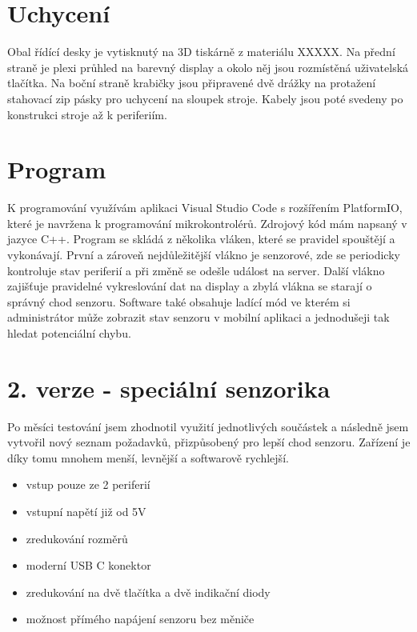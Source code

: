 \section{Uchycení}
Obal řídící desky je vytisknutý na 3D tiskárně z materiálu XXXXX.
\fxnote[author=JA]{\textcolor{mygreen}{Materiál)}}
Na přední straně je plexi průhled na barevný display a okolo něj jsou rozmístěná uživatelská tlačítka.
Na boční straně krabičky jsou připravené dvě drážky na protažení stahovací zip pásky pro uchycení na sloupek stroje.
Kabely jsou poté svedeny po konstrukci stroje až k periferiím.


\section{Program}
K programování využívám aplikaci Visual Studio Code s rozšířením PlatformIO, které je navržena k programování mikrokontrolérů. 
Zdrojový kód mám napsaný v jazyce C++.
Program se skládá z několika vláken, které se pravidel spouštějí a vykonávají.
První a zároveň nejdůležitější vlákno je senzorové, zde se periodicky kontroluje stav periferií a při změně se odešle událost na server.
Další vlákno zajišťuje pravidelné vykreslování dat na display a zbylá vlákna se starají o správný chod senzoru.
Software také obsahuje ladící mód ve kterém si administrátor může zobrazit stav senzoru v mobilní aplikaci a jednodušeji tak hledat potenciální chybu. 


\fxnote[author=JA]{\textcolor{mygreen}{Obrázek deksa => krabička}}

\newpage





\section{2. verze - speciální senzorika}

Po měsíci testování jsem zhodnotil využití jednotlivých součástek a následně jsem vytvořil nový seznam požadavků, přizpůsobený pro lepší chod senzoru.
Zařízení je díky tomu mnohem menší, levnější a softwarově rychlejší.

\begin{itemize}
    \item vstup pouze ze 2 periferií
    \item vstupní napětí již od 5V
    \item zredukování rozměrů
    \item moderní USB C konektor
    \item zredukování na dvě tlačítka a dvě indikační diody
    \item možnost přímého napájení senzoru bez měniče
\end{itemize}

